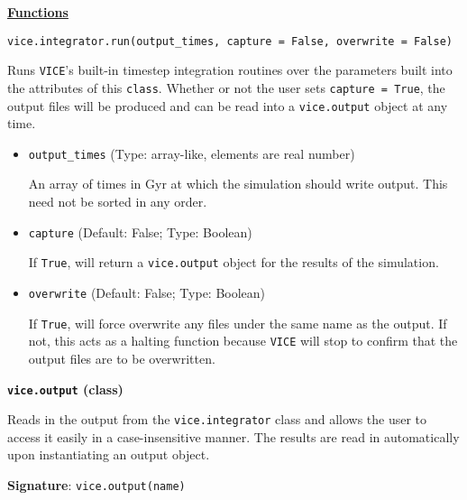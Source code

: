 \documentclass{report}
\begin{document}
\par\noindent
\underline{\textbf{Functions}} 
\par\null\par\noindent
\texttt{vice.integrator.run(output\_times, capture = False, overwrite = False)} 

\par 
Runs \texttt{VICE}'s built-in timestep integration routines over the 
parameters built into the attributes of this \texttt{class}. Whether or not 
the user sets \texttt{capture = True}, the output files will be produced and 
can be read into a \texttt{vice.output} object at any time. 

\begin{itemize}
	\item{ %
		\texttt{output\_times} (Type: array-like, elements are real number) 
		\par 
		An array of times in Gyr at which the simulation should write output. 
		This need not be sorted in any order. 
	}

	\item{ %
		\texttt{capture} (Default: False; Type: Boolean) 
		\par
		If \texttt{True}, will return a \texttt{vice.output} object for the 
		results of the simulation. 
	}

	\item{ %
		\texttt{overwrite} (Default: False; Type: Boolean) 
		\par
		If \texttt{True}, will force overwrite any files under the same name 
		as the output. If not, this acts as a halting function because 
		\texttt{VICE} will stop to confirm that the output files are to be 
		overwritten. 
	}
\end{itemize}

\null\par\noindent
\hypertarget{obj:output}{\textbf{\texttt{vice.output} (class)}} 
\par 
Reads in the output from the \texttt{vice.integrator} class and allows the user 
to access it easily in a case-insensitive manner. The results are read in 
automatically upon instantiating an output object. 

\par\null\par
\textbf{Signature}: \texttt{vice.output(name)}
\end{document}
